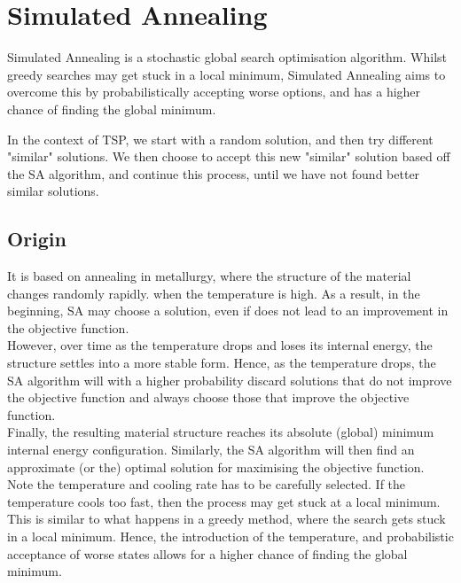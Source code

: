 \documentclass{article}
\begin{document}
\newpage
\section{Simulated Annealing}
Simulated Annealing is a stochastic global search optimisation algorithm.
Whilst greedy searches may get stuck in a local minimum, Simulated Annealing aims to overcome this by probabilistically accepting worse options, and has a higher chance of finding the global minimum.

In the context of TSP, we start with a random solution, and then try different "similar" solutions.
We then choose to accept this new "similar" solution based off the SA algorithm, and continue this process, until we have not found better similar solutions.
\\

\subsection{Origin}
It is based on annealing in metallurgy, where the structure of the material changes randomly rapidly. when the temperature is high.
As a result, in the beginning, SA may choose a solution, even if does not lead to an improvement in the objective function.
\\

However, over time as the temperature drops and loses its internal energy, the structure settles into a more stable form.
Hence, as the temperature drops, the SA algorithm will with a higher probability discard solutions that do not improve the objective function and always choose those that improve the objective function.
\\

Finally, the resulting material structure reaches its absolute (global) minimum internal energy configuration.
Similarly, the SA algorithm will then find an approximate (or the) optimal solution for maximising the objective function.
\\

Note the temperature and cooling rate has to be carefully selected.
If the temperature cools too fast, then the process may get stuck at a local minimum. 
This is similar to what happens in a greedy method, where the search gets stuck in a local minimum.
Hence, the introduction of the temperature, and probabilistic acceptance of worse states allows for a higher chance of finding the global minimum.
\\
\end{document}
